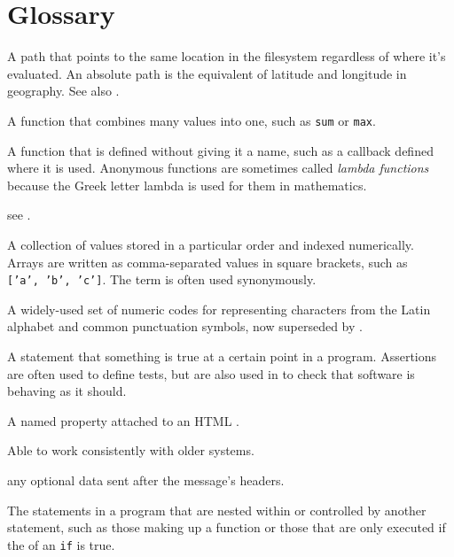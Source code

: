 \chapter{Glossary}\label{s:gloss}

\begin{description}

A path that points to the same location in the filesystem regardless of where
it's evaluated. An absolute path is the equivalent of latitude and longitude
in geography. See also .

A function that combines many values into one, such as \texttt{sum} or \texttt{max}.

A function that is defined without giving it a name, such as a callback
defined where it is used. Anonymous functions are sometimes called \emph{lambda
functions} because the Greek letter lambda is used for them in mathematics.

see .

A collection of values stored in a particular order and indexed numerically.
Arrays are written as comma-separated values in square brackets, such as
\texttt{['a',\ 'b',\ 'c']}. The term  is often used synonymously.

A widely-used set of numeric codes for representing characters from the Latin
alphabet and common punctuation symbols, now superseded by
.

A statement that something is true at a certain point in a program.
Assertions are often used to define tests,
but are also used in  to check that software is behaving as it should.

A named property attached to an HTML .

Able to work consistently with older systems.

any optional data sent after the message's headers.

The statements in a program that are nested within or controlled by another statement,
such as those making up a function or those that are only executed
if the  of an \texttt{if} is true.


\end{description}
